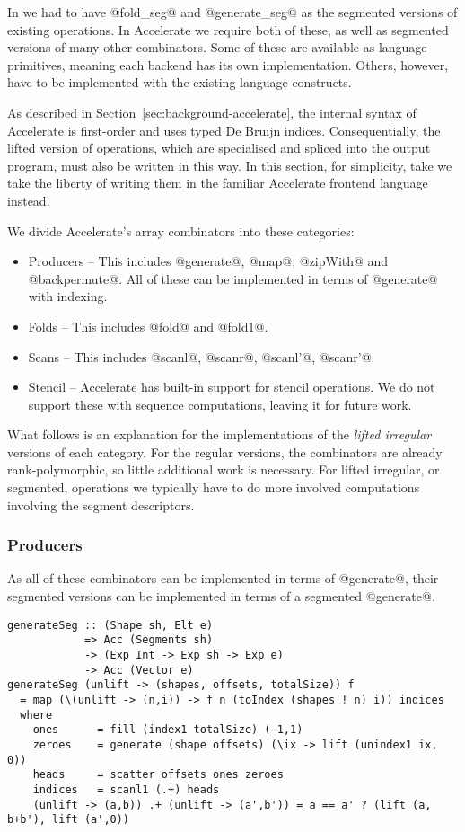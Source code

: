 In \ndp{} we had to have @fold_seg@ and @generate_seg@ as the segmented versions of existing operations. In Accelerate we require both of these, as well as segmented versions of many other combinators. Some of these are available as language primitives, meaning each backend has its own implementation. Others, however, have to be implemented with the existing language constructs.

As described in Section~\ref{sec:background-accelerate}, the internal syntax of Accelerate is first-order and uses typed De Bruijn indices. Consequentially, the lifted version of operations, which are specialised and spliced into the output program, must also be written in this way. In this section, for simplicity, take we take the liberty of writing them in the familiar Accelerate frontend language instead.

We divide Accelerate's array combinators into these categories:
%
\begin{itemize}
\item Producers -- This includes @generate@, @map@, @zipWith@ and @backpermute@. All of these can be implemented in terms of @generate@ with indexing.
\item Folds -- This includes @fold@ and @fold1@.
\item Scans -- This includes @scanl@, @scanr@, @scanl'@, @scanr'@.
\item Stencil -- Accelerate has built-in support for stencil operations. We do not support these with sequence computations, leaving it for future work.
\end{itemize}

What follows is an explanation for the implementations of the \emph{lifted irregular} versions of each category. For the regular versions, the combinators are already rank-polymorphic, so little additional work is necessary. For lifted irregular, or segmented, operations we typically have to do more involved computations involving the segment descriptors.

\subsubsection{Producers}
As all of these combinators can be implemented in terms of @generate@, their segmented versions can be implemented in terms of a segmented @generate@.
%
\begin{lstlisting}
generateSeg :: (Shape sh, Elt e)
            => Acc (Segments sh)
            -> (Exp Int -> Exp sh -> Exp e)
            -> Acc (Vector e)
generateSeg (unlift -> (shapes, offsets, totalSize)) f
  = map (\(unlift -> (n,i)) -> f n (toIndex (shapes ! n) i)) indices
  where
    ones      = fill (index1 totalSize) (-1,1)
    zeroes    = generate (shape offsets) (\ix -> lift (unindex1 ix, 0))
    heads     = scatter offsets ones zeroes
    indices   = scanl1 (.+) heads
    (unlift -> (a,b)) .+ (unlift -> (a',b')) = a == a' ? (lift (a, b+b'), lift (a',0))
\end{lstlisting}
%

